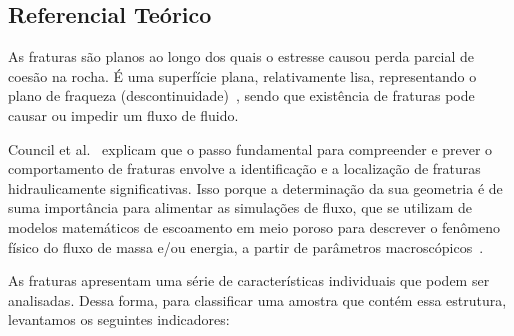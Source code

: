\documentclass[a4paper,10pt,twocolumn,twoside]{article}
\begin{document}
\subsection{Referencial Teórico}
\label{sec:referencial}

As fraturas são planos ao longo dos quais o estresse causou perda parcial de coesão na rocha. É uma superfície plana, relativamente lisa, representando o plano de fraqueza (descontinuidade)~\cite{singhal2010applied}, sendo que existência de fraturas pode causar ou impedir um fluxo de fluido.

Council et al.~\cite{national1996rock} explicam que o passo fundamental para compreender e prever o comportamento de fraturas envolve a identificação e a localização de fraturas hidraulicamente significativas. Isso porque a determinação da sua geometria é de suma importância para alimentar as simulações de fluxo, que se utilizam de modelos matemáticos de escoamento em meio poroso para descrever o fenômeno físico do fluxo de massa e/ou energia, a partir de parâmetros macroscópicos~\cite{ertekin2001basic}.

As fraturas apresentam uma série de características individuais que podem ser analisadas. Dessa forma, para classificar uma amostra que contém essa estrutura, levantamos os seguintes indicadores:
\end{document}
